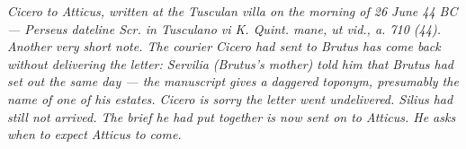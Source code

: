 
\textit{Cicero to Atticus, written at the Tusculan villa on the
morning of 26 June 44 BC --- Perseus dateline \textit{Scr. in
Tusculano vi K. Quint. mane, ut vid., a. 710 (44)}. Another very
short note. The courier Cicero had sent to Brutus has come back
without delivering the letter: Servilia (Brutus's mother) told
him that Brutus had set out the same day --- the manuscript
gives a daggered toponym, presumably the name of one of his
estates. Cicero is sorry the letter went undelivered. Silius
had still not arrived. The brief he had put together is now
sent on to Atticus. He asks when to expect Atticus to come.}

